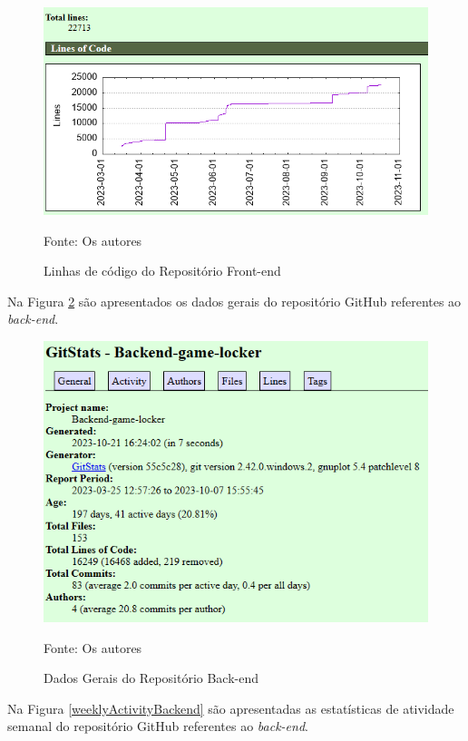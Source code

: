 \begin{apendicesenv}
\begin{figure}[H]
	\centering
	\includegraphics[scale=0.8]{./imagens/metricas/gitStatsFrontend/lines/linesOfCode.png}
	\caption{Linhas de código do Repositório Front-end}
	Fonte: Os autores
    \label{linesFrontend}
\end{figure}

Na Figura \ref{generalBackend} são apresentados os dados gerais do repositório GitHub referentes ao \textit{back-end}.

\begin{figure}[H]
	\centering
	\includegraphics[scale=0.8]{./imagens/metricas/gitStatsBackend/gitStatsGeneral.png}
	\caption{Dados Gerais do Repositório Back-end}
	Fonte: Os autores
    \label{generalBackend}
\end{figure}
\pagebreak

Na Figura \ref{weeklyActivityBackend} são apresentadas as estatísticas de atividade semanal do repositório GitHub referentes ao \textit{back-end}.


\end{apendicesenv}
